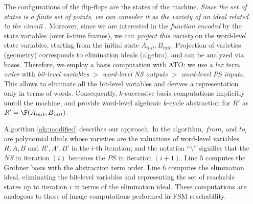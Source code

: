 The configurations of the flip-flops are the states of the
machine. {\it Since the set of states is a finite set of points, we
can consider it as the variety of an ideal related to the circuit
}. Moreover, since we are interested in
the {\it function encoded} by the state variables (over $k$-time
frames), we can {\it project this variety} on the word-level state
variables, starting from the initial state $A_{init}, B_{init}$.
Projection of varieties (geometry) corresponds to elimination ideals
(algebra), and can be analyzed via \Grobner bases. Therefore, we
employ a \Grobner basis computation with ATO: we use a {\it lex term
  order} with {\it bit-level variables} 
$>$ {\it word-level NS outputs} $>$ {\it word-level PS inputs}. This
allows to eliminate all the bit-level variables 
and derives a representation only in terms of words. 
Consequently, $k$-successive \Grobner basis computations implicitly
unroll the machine, and provide word-level algebraic $k$-cycle
abstraction for $R'$ as $R' = \F(A_{init}, B_{init})$. 

Algorithm
\ref{alg:modified} describes our approach.  In the algorithm, $from_i$
and $to_i$ are polynomial ideals whose varieties are the valuations of
word-level variables $R, A, B$ and $R',A',B'$ in the $i$-th iteration;
and the notation ``$\setminus$'' signifies that the $NS$ in iteration
$(i)$ becomes the $PS$ in iteration $(i+1)$. Line 5 computes the Gr\"obner 
basis with the abstraction term order.  Line 6 computes the elimination 
ideal, eliminating the bit-level variables and representing the set of 
reachable states up to iteration $i$ in terms of the elimination ideal. 
These computations are analogous to those of image computations performed in FSM reachability. 


